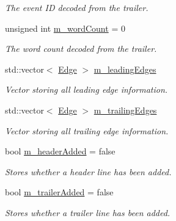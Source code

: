 \begin{DoxyCompactItemize}
\begin{DoxyCompactList}\small\item\em The event ID decoded from the trailer. \end{DoxyCompactList}\item 
unsigned int \hyperlink{class_packet_a6c3f1d98101c049bc032aca63d244b89}{m\+\_\+word\+Count} = 0
\begin{DoxyCompactList}\small\item\em The word count decoded from the trailer. \end{DoxyCompactList}\item 
std\+::vector$<$ \hyperlink{class_edge}{Edge} $>$ \hyperlink{class_packet_afea7ea47b52850e2f68b237036ceb3e1}{m\+\_\+leading\+Edges}
\begin{DoxyCompactList}\small\item\em Vector storing all leading edge information. \end{DoxyCompactList}\item 
std\+::vector$<$ \hyperlink{class_edge}{Edge} $>$ \hyperlink{class_packet_a0a91b78992e75fd203a187dcb34a81c1}{m\+\_\+trailing\+Edges}
\begin{DoxyCompactList}\small\item\em Vector storing all trailing edge information. \end{DoxyCompactList}\item 
bool \hyperlink{class_packet_aaf9fa3ad2c94bec82a748366fb00ecc7}{m\+\_\+header\+Added} = false
\begin{DoxyCompactList}\small\item\em Stores whether a header line has been added. \end{DoxyCompactList}\item 
bool \hyperlink{class_packet_a046581698cdcca7297109ceaeed7e014}{m\+\_\+trailer\+Added} = false
\begin{DoxyCompactList}\small\item\em Stores whether a trailer line has been added. \end{DoxyCompactList}\end{DoxyCompactItemize}
